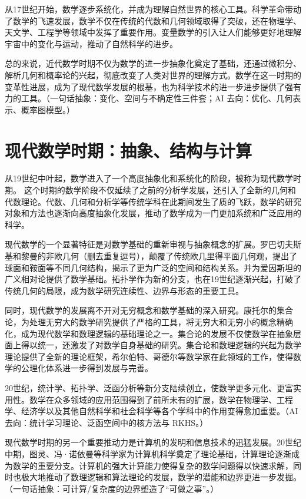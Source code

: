 从17世纪开始，数学逐步系统化，并成为理解自然世界的核心工具。科学革命带动了数学的飞速发展，数学不仅在传统的代数和几何领域取得了突破，还在物理学、天文学、工程学等领域中发挥了重要作用。变量数学的引入让人们能够更好地理解宇宙中的变化与运动，推动了自然科学的进步。

总的来说，近代数学时期不仅为数学的进一步抽象化奠定了基础，还通过微积分、解析几何和概率论的兴起，彻底改变了人类对世界的理解方式。数学在这一时期的变革性进展，成为了现代数学发展的根基，也为科学技术的进一步进步提供了强有力的工具。{（一句话抽象：变化、空间与不确定性三件套；AI 去向：优化、几何表示、概率图模型。）}

\section{现代数学时期：抽象、结构与计算}
从19世纪中叶起，数学进入了一个高度抽象化和系统化的阶段，被称为现代数学时期。
这个时期的数学阶段不仅延续了之前的分析学发展，还引入了全新的几何和代数理论。代数、几何和分析学等传统学科在此期间发生了质的飞跃，数学的研究对象和方法也逐渐向高度抽象化发展，推动了数学成为一门更加系统和广泛应用的科学。

现代数学的一个显著特征是对数学基础的重新审视与抽象概念的扩展。罗巴切夫斯基和黎曼的非欧几何{（删去重复逗号）}，颠覆了传统欧几里得平面几何观，提出了球面和鞍面等不同几何结构，揭示了更为广泛的空间和结构关系。{并为爱因斯坦的广义相对论提供了数学基础。}拓扑学作为新的分支，也在19世纪逐渐兴起，打破了传统几何的局限，成为数学研究连续性、边界与形态的重要工具。

同时，现代数学的发展离不开对无穷概念和数学基础的深入研究。康托尔的集合论，为处理无穷大的数学研究提供了严格的工具，将无穷大和无穷小的概念精确化，成为现代数学和数理逻辑的基础理论之一。集合论的发展不仅使数学在抽象层面上得以统一，还激发了对数学自身基础的研究。集合论和数理逻辑的兴起为数学理论提供了全新的理论框架，希尔伯特、哥德尔等数学家在此领域的工作，使得数学的公理化体系进一步得到发展与完善。

20世纪，统计学、拓扑学、泛函分析等新分支陆续创立，使数学更多元化、更富实用性。数学在众多领域的应用范围得到了前所未有的扩展，数学在物理学、工程学、经济学以及其他自然科学和社会科学等各个学科中的作用变得愈加重要。{（AI 去向：统计学习理论、泛函空间中的核方法与 RKHS。）}

现代数学时期的另一个重要推动力是计算机的发明和信息技术的迅猛发展。20世纪中期，图灵、冯·诺依曼等科学家为计算机科学奠定了理论基础，计算理论逐渐成为数学的重要分支。计算机的强大计算能力使得复杂的数学问题得以快速求解，同时也极大地推动了数理逻辑和算法理论的发展，数学的潜能和边界更进一步发掘。{（一句话抽象：可计算/复杂度的边界塑造了“可做之事”。）}

